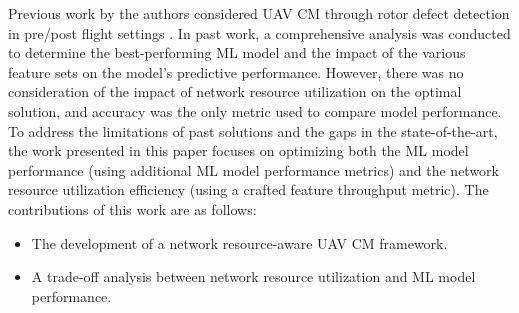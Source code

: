 Previous work by the authors considered UAV CM through rotor defect detection in pre/post flight settings \cite{gemayel2024machine}. In past work, a comprehensive analysis was conducted to determine the best-performing ML model and the impact of the various feature sets on the model's predictive performance. However, there was no consideration of the impact of network resource utilization on the optimal solution, and accuracy was the only metric used to compare model performance. To address the limitations of past solutions and the gaps in the state-of-the-art, the work presented in this paper focuses on optimizing both the ML model performance (using additional ML model performance metrics) and the network resource utilization efficiency (using a crafted feature throughput metric).
The contributions of this work are as follows:
\begin{itemize}
    \item The development of a network resource-aware UAV CM framework.
    \item A trade-off analysis between network resource utilization and ML model performance.
\end{itemize}